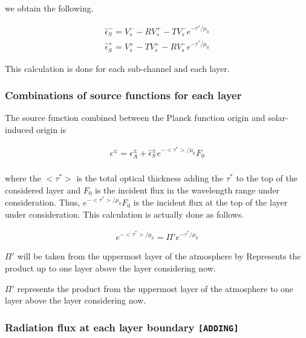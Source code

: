 we obtain the following.

\begin{eqnarray}
  \hat{\epsilon}_S^-  =  V_s^- - R V_s^+ - T V_s^- e^{-\tau^*/\mu_0} \\
  \hat{\epsilon}_S^+  =  V_s^+ - T V_s^+ - R V_s^- e^{-\tau^*/\mu_0}
\end{eqnarray}

This calculation is done for each sub-channel and each layer.

\hypertarget{combinations-of-source-functions-for-each-layer}{%
\subsubsection{Combinations of source functions for each
layer}\label{combinations-of-source-functions-for-each-layer}}

The source function combined between the Planck function origin and solar-induced origin is

\begin{eqnarray}
  \epsilon^\pm  = 
  \epsilon_A^\pm + \hat{\epsilon}_S^\pm e^{-<\tau^*>/\mu_0} F_0 \\
\end{eqnarray}

where the \(<\tau^*>\) is the total optical thickness adding the \(\tau^*\) to the top of the considered layer and \(F_0\) is the incident flux in the wavelength range under consideration. Thus, \(e^{-<\tau^*>/\mu_0} F_0\) is the
incident flux at the top of the layer under consideration. This calculation is actually done as follows.

\begin{eqnarray}
  e^{-<\tau^*>/\mu_0} = \Pi' e^{-\tau^*/\mu_0}
\end{eqnarray}

\(\Pi'\) will be taken from the uppermost
layer of the atmosphere by Represents the product up to one layer above
the layer considering now.

\(\Pi'\) represents the product from the uppermost layer of the atmosphere to one layer above
the layer considering now.

\hypertarget{radiation-flux-at-each-layer-boundary-adding}{%
\subsubsection{\texorpdfstring{Radiation flux at each layer boundary
\texttt{{[}ADDING{]}}}{Radiation flux at each layer boundary {[}ADDING{]}}}\label{radiation-flux-at-each-layer-boundary-moduleadding}}


